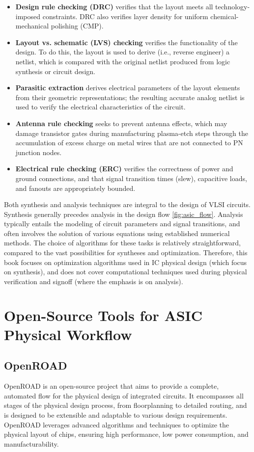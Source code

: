 \begin{itemize}
    \item \textbf{Design rule checking (DRC)} verifies that the layout meets all technology-imposed constraints. DRC also verifies layer density for uniform chemical-mechanical polishing (CMP).
    \item \textbf{Layout vs. schematic (LVS) checking} verifies the functionality of the design. To do this, the layout is used to derive (i.e., reverse engineer) a netlist, which is compared with the original netlist produced from logic synthesis or circuit design.
    \item \textbf{Parasitic extraction} derives electrical parameters of the layout elements from their geometric representations; the resulting accurate analog netlist is used to verify the electrical characteristics of the circuit.
    \item \textbf{Antenna rule checking} seeks to prevent antenna effects, which may damage transistor gates during manufacturing plasma-etch steps through the accumulation of excess charge on metal wires that are not connected to PN junction nodes.
    \item \textbf{Electrical rule checking (ERC)} verifies the correctness of power and ground connections, and that signal transition times (slew), capacitive loads, and fanouts are appropriately bounded.
\end{itemize}

Both synthesis and analysis techniques are integral to the design of VLSI circuits. Synthesis generally precedes analysis in the design flow \ref{fig:asic_flow}. Analysis typically entails the modeling of circuit parameters and signal transitions, and often involves the solution of various equations using established numerical methods. The choice of algorithms for these tasks is relatively straightforward, compared to the vast possibilities for syntheses and optimization. Therefore, this book focuses on optimization algorithms used in IC physical design (which focus on synthesis), and does not cover computational techniques used during physical verification and signoff (where the emphasis is on analysis).

\section{Open-Source Tools for ASIC Physical Workflow}

\subsection{OpenROAD}
OpenROAD is an open-source project that aims to provide a complete, automated flow for the physical design of integrated circuits. It encompasses all stages of the physical design process, from floorplanning to detailed routing, and is designed to be extensible and adaptable to various design requirements. OpenROAD leverages advanced algorithms and techniques to optimize the physical layout of chips, ensuring high performance, low power consumption, and manufacturability.

